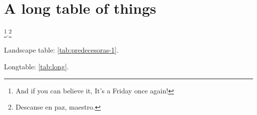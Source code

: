 % 
% 
% 




\chapter{A long table of things}

\lipsum[90-93] \footnote{And if you can believe it, It's a Friday once again!}.\footnote{Descanse en paz, maestro.} \lipsum[94] 

Landscape table: \autoref{tab:predecesoras-1}. 

Longtable: \autoref{tab:long}. 

